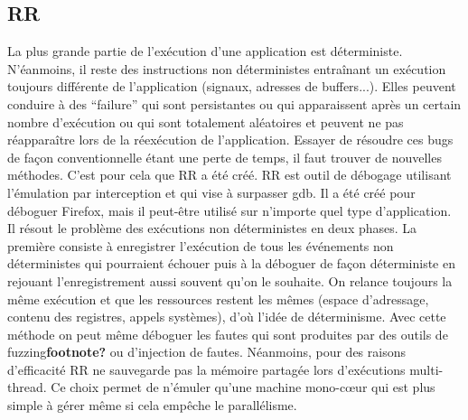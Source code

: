 \subsection{RR}
\label{subsection:RR}

La plus grande partie de l'exécution d'une application est déterministe. N'éanmoins, il reste des instructions non déterministes entraînant un exécution toujours différente de l'application  (signaux, adresses de buffers...). Elles peuvent conduire à des ``failure''  qui sont persistantes ou qui apparaissent après un certain nombre d'exécution ou qui sont totalement aléatoires et peuvent ne pas réapparaître lors de la réexécution de l'application. Essayer de résoudre ces bugs de façon conventionnelle étant une perte de temps, il faut trouver de nouvelles méthodes. C'est pour cela que RR a été créé. RR \citep{RR} est outil de débogage utilisant l'émulation par interception et qui vise à surpasser gdb. Il a été créé pour déboguer Firefox, mais il peut-être utilisé sur n'importe quel type d'application. Il résout le problème des exécutions non déterministes en deux phases. La première consiste à enregistrer l'exécution de tous les événements non déterministes qui pourraient échouer puis à la déboguer de façon déterministe en rejouant l'enregistrement aussi souvent qu'on le souhaite. On relance toujours la même exécution et que les ressources restent les mêmes (espace d'adressage, contenu des registres, appels systèmes), d'où l'idée de déterminisme. Avec cette méthode on peut même déboguer les fautes qui sont produites par des outils de fuzzing\textbf{footnote?} ou d'injection de fautes. Néanmoins, pour des raisons d'efficacité RR ne sauvegarde pas la mémoire partagée lors d'exécutions multi-thread. Ce choix permet de n'émuler qu'une machine mono-c\oe ur qui est plus simple à gérer même si cela empêche le parallélisme.

